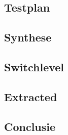 \documentclass{scrartcl} %
\begin{document}
\subsection{Testplan}


\subsection{Synthese}


\subsection{Switchlevel}


\subsection{Extracted}

\subsection{Conclusie}
\end{document}
